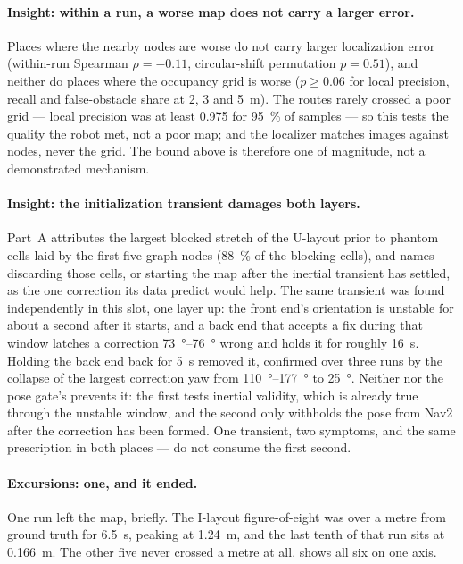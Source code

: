 \documentclass[11pt,a4paper,notitlepage]{report}
\begin{document}
\paragraph{Insight: within a run, a worse map does not carry a larger error.}
Places where the nearby nodes are worse do not carry larger localization error
(within-run Spearman $\rho = -0.11$, circular-shift permutation $p = 0.51$),
and neither do places where the occupancy grid is worse ($p \geq 0.06$ for
local precision, recall and false-obstacle share at 2, 3 and
\SI{5}{\metre}). The routes rarely crossed a
poor grid --- local precision was at least 0.975 for \SI{95}{\percent} of
samples --- so this tests the quality the robot met, not a poor map; and the
localizer matches images against nodes, never the grid. The bound above is
therefore one of magnitude, not a demonstrated mechanism.



\paragraph{Insight: the initialization transient damages both layers.}
Part~A attributes the largest blocked stretch of the U-layout prior to phantom
cells laid by the first five graph nodes (\SI{88}{\percent} of the blocking
cells), and names discarding those cells, or
starting the map after the inertial transient has settled, as the one
correction its data predict would help. The same transient was found
independently in this slot, one layer up: the front end's orientation is
unstable for about a second after it starts, and a back end that accepts a fix
during that window latches a correction \SIrange{73}{76}{\degree} wrong and
holds it for roughly \SI{16}{\second}. Holding the back end back for
\SI{5}{\second} removed it, confirmed over three runs by the collapse of the
largest correction yaw from \SIrange{110}{177}{\degree} to \SI{25}{\degree}.
Neither  nor the pose gate's 
prevents it: the first tests inertial validity, which is already true through
the unstable window, and the second only withholds the pose from Nav2 after the
correction has been formed. One transient, two symptoms, and the same
prescription in both places --- do not consume the first second.

\paragraph{Excursions: one, and it ended.} One run left the map,
briefly. The I-layout figure-of-eight was over a metre from ground truth for
\SI{6.5}{\second}, peaking at \SI{1.24}{\metre}, and the last tenth of that
run sits at \SI{0.166}{\metre}. The other five never crossed a metre at all.
 shows all six on one axis.
\end{document}
